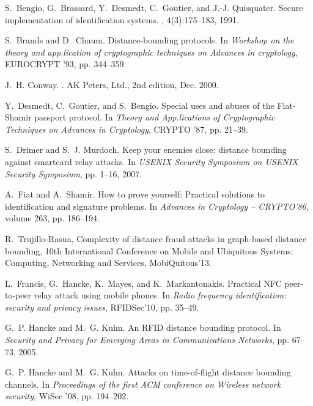 \documentclass{llncs}
\begin{document}
{\begin{thebibliography}{10}
S.~Bengio, G.~Brassard, Y.~Desmedt, C.~Goutier, and J.-J. Quisquater.
\newblock Secure implementation of identification systems.
, 4(3):175--183, 1991.

S.~Brands and D.~Chaum.
\newblock Distance-bounding protocols.
\newblock In {\em Workshop on the theory and app.lication of cryptographic
  techniques on Advances in cryptology}, EUROCRYPT '93, pp. 344--359.

J.~H. Conway.
.
\newblock AK Peters, Ltd., 2nd edition, Dec. 2000.

Y.~Desmedt, C.~Goutier, and S.~Bengio.
\newblock Special uses and abuses of the {F}iat-{S}hamir passport protocol.
\newblock In {\em Theory and App.lications of Cryptographic
  Techniques on Advances in Cryptology}, CRYPTO '87, pp. 21--39.

S.~Drimer and S.~J. Murdoch.
\newblock Keep your enemies close: distance bounding against smartcard relay
  attacks.
\newblock In {\em USENIX Security Symposium on USENIX Security Symposium},
  pp. 1--16, 2007.

A.~Fiat and A.~Shamir.
\newblock How to prove yourself: Practical solutions to identification and
  signature problems.
\newblock In {\em Advances in Cryptology -- CRYPTO'86}, volume 263, pp.
186--194.

  	R.~Trujillo-Rasua, Complexity of distance fraud attacks in graph-based 
  	distance  bounding, 10th International Conference on Mobile and Ubiquitous 
  	Systems: Computing, Networking and Services, MobiQuitous'13.


L.~Francis, G.~Hancke, K.~Mayes, and K.~Markantonakis.
\newblock Practical {NFC} peer-to-peer relay attack using mobile phones.
\newblock In {\em Radio
  frequency identification: security and privacy issues}, RFIDSec'10, pp.
  35--49.

G.~P. Hancke and M.~G. Kuhn.
\newblock An {RFID} distance bounding protocol.
\newblock In {\em Security
  and Privacy for Emerging Areas in Communications Networks}, pp. 67--73, 2005.

G.~P. Hancke and M.~G. Kuhn.
\newblock Attacks on time-of-flight distance bounding channels.
\newblock In {\em Proceedings of the first ACM conference on Wireless network
  security}, WiSec '08, pp. 194--202.


\end{thebibliography}}
\end{document}
